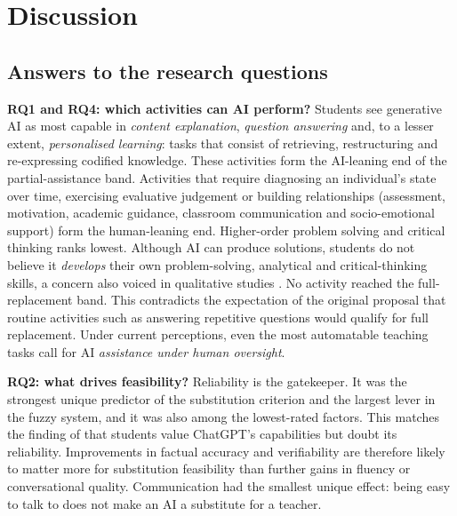 \documentclass[preprint,12pt,authoryear]{elsarticle}
\theoremstyle{remark}
\begin{document}


\section{Discussion}
\label{sec:discussion}

\subsection{Answers to the research questions}
\textbf{RQ1 and RQ4: which activities can AI perform?} Students see generative AI as most capable in \emph{content explanation}, \emph{question answering} and, to a lesser extent, \emph{personalised learning}: tasks that consist of retrieving, restructuring and re-expressing codified knowledge. These activities form the AI-leaning end of the partial-assistance band. Activities that require diagnosing an individual's state over time, exercising evaluative judgement or building relationships (assessment, motivation, academic guidance, classroom communication and socio-emotional support) form the human-leaning end. Higher-order problem solving and critical thinking ranks lowest. Although AI can produce solutions, students do not believe it \emph{develops} their own problem-solving, analytical and critical-thinking skills, a concern also voiced in qualitative studies \citep{chantsi2024,chanhu2023}. No activity reached the full-replacement band. This contradicts the expectation of the original proposal that routine activities such as answering repetitive questions would qualify for full replacement. Under current perceptions, even the most automatable teaching tasks call for AI \emph{assistance under human oversight}.

\textbf{RQ2: what drives feasibility?} Reliability is the gatekeeper. It was the strongest unique predictor of the substitution criterion and the largest lever in the fuzzy system, and it was also among the lowest-rated factors. This matches the finding of \citet{ravselj2025} that students value ChatGPT's capabilities but doubt its reliability. Improvements in factual accuracy and verifiability are therefore likely to matter more for substitution feasibility than further gains in fluency or conversational quality. Communication had the smallest unique effect: being easy to talk to does not make an AI a substitute for a teacher.
\end{document}
